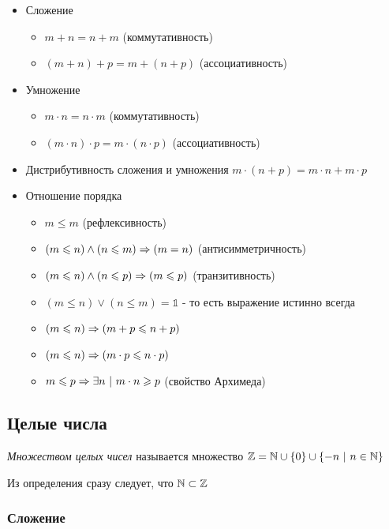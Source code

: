 \begin{itemize}
    \item Сложение
    \begin{itemize}
        \item $m + n = n + m$ (коммутативность)
        \item $(m + n) + p = m + (n + p)$ (ассоциативность)
    \end{itemize}
    \item Умножение
    \begin{itemize}
        \item $m \cdot n = n \cdot m$ (коммутативность)
        \item $(m \cdot n) \cdot p = m \cdot (n \cdot p)$ (ассоциативность)
    \end{itemize}
    \item Дистрибутивность сложения и умножения
    $m \cdot (n + p) = m \cdot n + m \cdot p$
    \item Отношение порядка
    \begin{itemize}
        \item $m \le m$ (рефлексивность)
        \item $(m \leqslant n) \wedge (n \leqslant m) \Rightarrow (m = n)$ (антисимметричность)
        \item $(m \leqslant n) \wedge (n \leqslant p) \Rightarrow (m \leqslant p)$ (транзитивность)
        \item $(m \le n) \vee (n \le m) = \mathbb{1}$ - то есть выражение истинно всегда
        \item $(m \leqslant n) \Rightarrow (m + p \leqslant n + p)$
        \item $(m \leqslant n) \Rightarrow (m \cdot p \leqslant n \cdot p)$
        \item $m \leqslant p \Rightarrow \exists n\ |\ m \cdot n \geqslant p$ (свойство Архимеда)
    \end{itemize}
\end{itemize}


\subsection{Целые числа}

\begin{definition}
    \textit{Множеством целых чисел} называется множество $\mathbb{Z} = \mathbb{N} \cup \{0\} \cup \{-n\ |\ n \in \mathbb{N}\}$
\end{definition}

Из определения сразу следует, что $\mathbb{N} \subset \mathbb{Z}$

\subsubsection*{Сложение}

